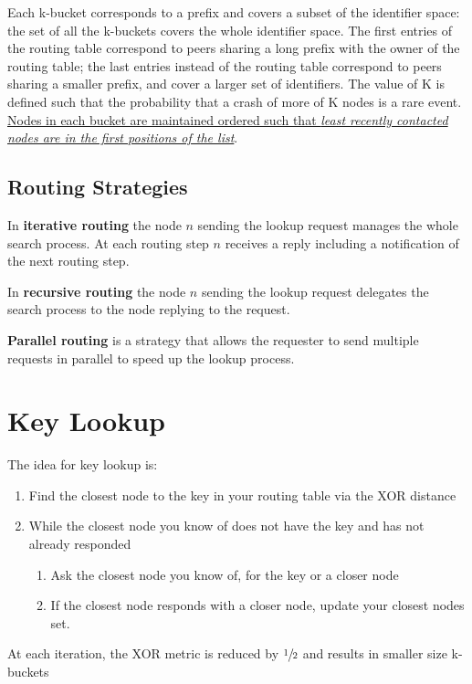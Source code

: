 Each k-bucket corresponds to a prefix and covers a subset of the identifier space: the set of all the k-buckets covers the whole identifier space.
The first entries of the routing table correspond to peers sharing a long prefix
with the owner of the routing table; the last entries instead of the routing table correspond to peers sharing a smaller prefix, and cover a larger set of identifiers.
The value of K is defined such that the probability that a crash of more of K
nodes is a rare event.
\ul{Nodes in each bucket are maintained ordered such that \textit{least recently contacted nodes are in the first positions of the list}}.


\subsection{Routing Strategies}
In \textbf{iterative routing} the node $n$ sending the lookup request manages the whole search process.
At each routing step  $n$ receives a reply including a notification of the next routing step.

In \textbf{recursive routing} the node $n$ sending the lookup request delegates the search process to the node replying to the request.

\textbf{Parallel routing} is a strategy that allows the requester to send multiple requests in parallel to speed up the lookup process.

\section{Key Lookup}

The idea for key lookup is:
\begin{enumerate}
   \item Find the closest node to the key in your routing table via the XOR distance
   \item While the closest node you know of does not have the key and has not already responded
   \begin{enumerate}
      \item Ask the closest node you know of, for the key or a closer node
      \item If the closest node responds with a closer node, update your closest nodes set.
   \end{enumerate}
\end{enumerate}
At each iteration, the XOR metric is reduced by $\sfrac{1}{2}$ and results in smaller size k-buckets

